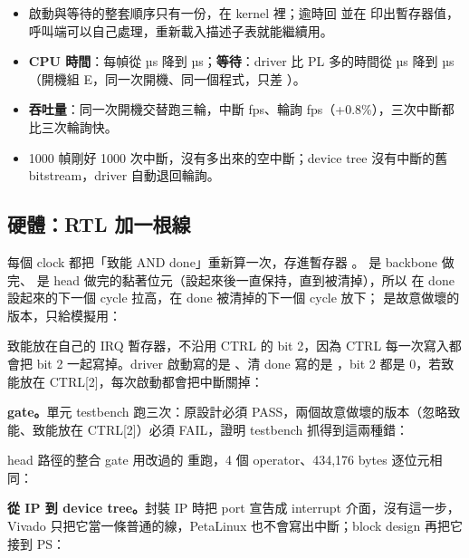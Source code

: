 \begin{gain}
\begin{itemize}
\item 啟動與等待的整套順序只有一份，在 kernel 裡；逾時回  並在  印出暫存器值，呼叫端可以自己處理，重新載入描述子表就能繼續用。
\item \textbf{CPU 時間}：每幀從 \pollCpuUs{} µs 降到 \irqCpuUs{} µs；\textbf{等待}：driver 比 PL 多的時間從 \pollWaitUs{} µs 降到 \irqWaitUs{} µs（開機組 E，同一次開機、同一個程式，只差 ）。
\item \textbf{吞吐量}：同一次開機交替跑三輪，中斷 \hIrqFps{} fps、輪詢 \hPollFps{} fps（+0.8\%），三次中斷都比三次輪詢快。
\item 1000 幀剛好 1000 次中斷，沒有多出來的空中斷；device tree 沒有中斷的舊 bitstream，driver 自動退回輪詢。
\end{itemize}
\end{gain}

\subsection{硬體：RTL 加一根線}

每個 clock 都把「致能 AND done」重新算一次，存進暫存器 。 是 backbone 做完、 是 head 做完的黏著位元（設起來後一直保持，直到被清掉），所以  在 done 設起來的下一個 cycle 拉高，在 done 被清掉的下一個 cycle 放下； 是故意做壞的版本，只給模擬用：


致能放在自己的 IRQ 暫存器，不沿用 CTRL 的 bit 2，因為 CTRL 每一次寫入都會把 bit 2 一起寫掉。driver 啟動寫的是 、清 done 寫的是 ，bit 2 都是 0，若致能放在 CTRL[2]，每次啟動都會把中斷關掉：


\textbf{gate。}單元 testbench 跑三次：原設計必須 PASS，兩個故意做壞的版本（忽略致能、致能放在 CTRL[2]）必須 FAIL，證明 testbench 抓得到這兩種錯：


head 路徑的整合 gate 用改過的  重跑，4 個 operator、434,176 bytes 逐位元相同：


\textbf{從 IP 到 device tree。}封裝 IP 時把 port 宣告成 interrupt 介面，沒有這一步，Vivado 只把它當一條普通的線，PetaLinux 也不會寫出中斷；block design 再把它接到 PS：

